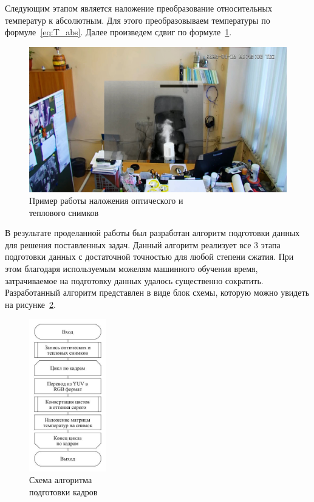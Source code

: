 \documentclass[14pt, a4paper]{extreport}
\begin{document}
	Следующим этапом является наложение преобразование относительных температур к абсолютным. Для этого преобразовываем температуры по формуле~\ref{eq:T_abs}. Далее произведем сдвиг по формуле~\ref{fig:nalozhenie}.
	\begin{figure}[h!]
		\centering
		\includegraphics[width = 13cm]{image/chapter_2/nalozhenie}	
		\caption{Пример работы наложения оптического и\\теплового снимков}
		\label{fig:nalozhenie}
	\end{figure}
	
	В результате проделанной работы был разработан алгоритм подготовки данных для решения поставленных задач. Данный алгоритм реализует все 3 этапа подготовки данных с достаточной точностью для любой степени сжатия. При этом благодаря используемым можелям машинного обучения время, затрачиваемое на подготовку данных удалось существенно сократить. Разработанный алгоритм представлен в виде блок схемы, которую можно увидеть на рисунке~\ref{fig:fullprepare}.
	\vspace*{-0.2cm}
	\begin{figure}[h!]
		\centering
		\includegraphics[width = 0.3\textwidth]{image/chapter_2/fullprepare}	
		\vspace*{-0.4cm}\caption{Схема алгоритма \\подготовки кадров}
		\label{fig:fullprepare}
	\end{figure}
	\newpage
\end{document}

